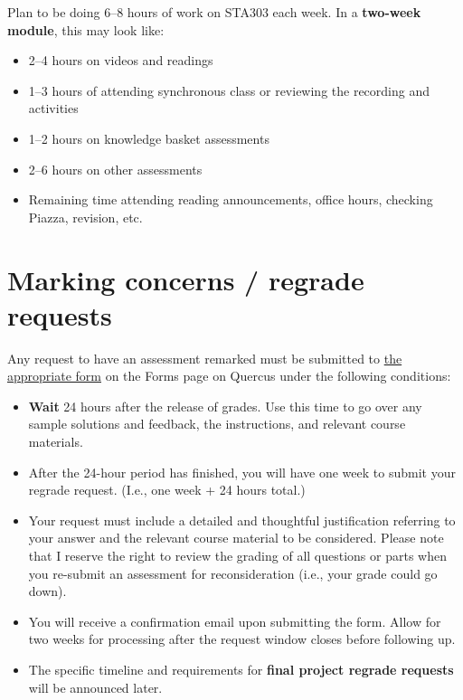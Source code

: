 \documentclass[
  openany]{book}
\begin{document}
Plan to be doing 6--8 hours of work on STA303 each week. In a \textbf{two-week module}, this may look like:

\begin{itemize}
\item
  2--4 hours on videos and readings
\item
  1--3 hours of attending synchronous class or reviewing the recording and activities
\item
  1--2 hours on knowledge basket assessments
\item
  2--6 hours on other assessments
\item
  Remaining time attending reading announcements, office hours, checking Piazza, revision, etc.
\end{itemize}

\hypertarget{marking-concerns-regrade-requests}{%
\section{Marking concerns / regrade requests}\label{marking-concerns-regrade-requests}}

Any request to have an assessment remarked must be submitted to \href{https://forms.office.com/Pages/ResponsePage.aspx?id=JsKqeAMvTUuQN7RtVsVSEOKHUU3SzAJJhmOKjJhDWEpUNE02UzJaMUNQM0Q2U0RTOUlJS1JMM1dCTC4u}{the appropriate form} on the Forms page on Quercus under the following conditions:

\begin{itemize}
\item
  \textbf{Wait} 24 hours after the release of grades. Use this time to go over any sample solutions and feedback, the instructions, and relevant course materials.
\item
  After the 24-hour period has finished, you will have one week to submit your regrade request. (I.e., one week + 24 hours total.)
\item
  Your request must include a detailed and thoughtful justification referring to your answer and the relevant course material to be considered. Please note that I reserve the right to review the grading of all questions or parts when you re-submit an assessment for reconsideration (i.e., your grade could go down).
\item
  You will receive a confirmation email upon submitting the form. Allow for two weeks for processing after the request window closes before following up.
\item
  The specific timeline and requirements for \textbf{final project regrade requests} will be announced later.
\end{itemize}
\end{document}
